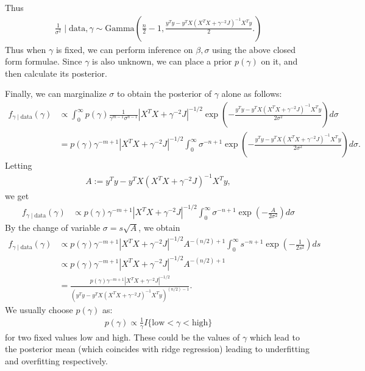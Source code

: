\documentclass{scrartcl}
\begin{document}
Thus
\begin{align}\label{sig_post}
  \frac{1}{\sigma^2} \mid \text{data}, \gamma \sim
  \text{Gamma}\left(\frac{n}{2} - 1, \frac{y^T y - y^T X \left(X^T X + 
 \gamma^{-2} J \right)^{-1} X^T y}{2}. 
  \right) 
\end{align}
Thus when $\gamma$ is fixed, we can perform inference on $\beta,
\sigma$ using the above closed form formulae. Since $\gamma$ is also
unknown, we can place a prior $p(\gamma)$ on it, and then calculate
its posterior.  

Finally, we can marginalize $\sigma$ to obtain the posterior of
$\gamma$ alone as follows:
\begin{align*}
  f_{\gamma \mid \text{data}}(\gamma) &\propto \int_0^{\infty}
                                        p(\gamma)
                                        \frac{1}{\gamma^{m-1} \sigma^{n-1}}
 \left|X^T X + \gamma^{-2} J 
  \right|^{-1/2} \exp 
  \left(-\frac{y^T y - y^T X \left(X^T X + 
 \gamma^{-2} J \right)^{-1} X^T y}{2\sigma^2} 
                                        \right)  d\sigma  \\
&= p(\gamma)  \gamma^{-m+1} \left|X^T X + \gamma^{-2} J 
  \right|^{-1/2} \int_0^{\infty}  \sigma^{-n+1}\exp 
  \left(-\frac{y^T y - y^T X \left(X^T X + 
 \gamma^{-2} J \right)^{-1} X^T y}{2\sigma^2} 
                                        \right)  d\sigma. 
\end{align*}
Letting
\begin{align*}
  A := y^T y - y^T X \left(X^T X + 
 \gamma^{-2} J \right)^{-1} X^T y, 
\end{align*}
we get
\begin{align*}
  f_{\gamma \mid \text{data}}(\gamma) &\propto  p(\gamma) \gamma^{-m+1} \left|X^T X + \gamma^{-2} J 
  \right|^{-1/2} \int_0^{\infty} \sigma^{-n+1} \exp \left(-\frac{A}{2
                                        \sigma^2} \right) d\sigma 
\end{align*}
By the change of variable $\sigma = s \sqrt{A}$, we obtain
\begin{align*}
  f_{\gamma \mid \text{data}}(\gamma) &\propto  p(\gamma)  \gamma^{-m+1} \left|X^T X + \gamma^{-2} J 
  \right|^{-1/2} A^{-(n/2) + 1} \int_0^{\infty} s^{-n+1} \exp \left(-\frac{1}{2s^2}
  \right) ds \\
  &\propto p(\gamma)  \gamma^{-m+1} \left|X^T X + \gamma^{-2} J 
    \right|^{-1/2} A^{-(n/2) + 1} \\
  &=   \frac{p(\gamma)\gamma^{-m+1} \left|X^T X + \gamma^{-2} J 
    \right|^{-1/2}}{\left(y^T y - y^T X \left(X^T X + 
 \gamma^{-2} J \right)^{-1} X^T y \right)^{(n/2) - 1}}. 
\end{align*}
We usually choose $p(\gamma)$ as:
\begin{align*}
p(\gamma) \propto \frac{1}{\gamma} I\{\text{low} < \gamma <
  \text{high}\}
\end{align*}
for two fixed values $\text{low}$ and $\text{high}$. These could be
the values of  $\gamma$ which lead to the posterior mean (which
coincides with ridge regression) leading to underfitting and
overfitting respectively. 
\end{document}
